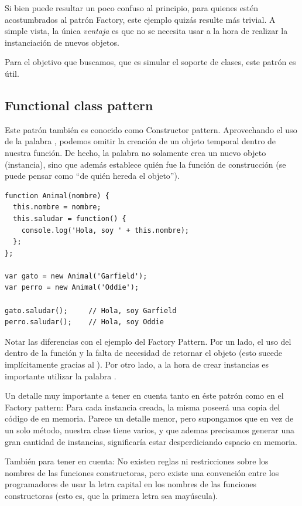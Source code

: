 Si bien puede resultar un poco confuso al principio, para quienes estén acostumbrados al patrón Factory, este ejemplo quizás resulte más trivial. A simple vista, la única \textit{ventaja} es que no se necesita usar  a la hora de realizar la instanciación de nuevos objetos. 

Para el objetivo que buscamos, que es simular el soporte de clases, este patrón es útil.

\subsection{Functional class pattern}

Este patrón también es conocido como Constructor pattern. Aprovechando el uso de la palabra , podemos omitir la creación de un objeto temporal dentro de nuestra función. De hecho, la palabra  no solamente crea un nuevo objeto (instancia), sino que además establece quién fue la función de construcción (se puede pensar como "`de quién hereda el objeto"').

\begin{lstlisting}[title={Functional class pattern}]
function Animal(nombre) {
  this.nombre = nombre;
  this.saludar = function() {
    console.log('Hola, soy ' + this.nombre);
  };
};

var gato = new Animal('Garfield');
var perro = new Animal('Oddie');

gato.saludar();		// Hola, soy Garfield
perro.saludar();	// Hola, soy Oddie
\end{lstlisting}

Notar las diferencias con el ejemplo del Factory Pattern. Por un lado, el uso del  dentro de la función y la falta de necesidad de retornar el objeto (esto sucede implícitamente gracias al ). Por otro lado, a la hora de crear instancias es importante utilizar la palabra .

Un detalle muy importante a tener en cuenta tanto en éste patrón como en el Factory pattern: Para cada instancia creada, la misma poseerá una copia del código de  en memoria. Parece un detalle menor, pero supongamos que en vez de un solo método, nuestra clase tiene varios, y que ademas precisamos generar una gran cantidad de instancias, significaría estar desperdiciando espacio en memoria.

También para tener en cuenta: No existen reglas ni restricciones sobre los nombres de las funciones constructoras, pero existe una convención entre los programadores de usar la letra capital en los nombres de las funciones constructoras (esto es, que la primera letra sea mayúscula).

